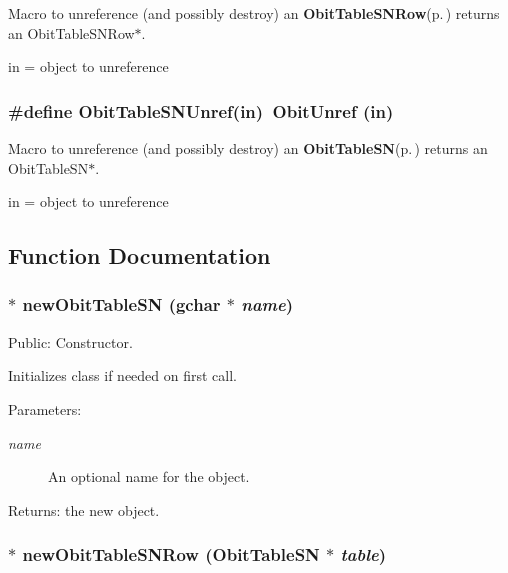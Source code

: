 Macro to unreference (and possibly destroy) an {\bf Obit\-Table\-SNRow}{\rm (p.\,\pageref{structObitTableSNRow})} returns an Obit\-Table\-SNRow$\ast$. 

in = object to unreference 
\subsubsection{\setlength{\rightskip}{0pt plus 5cm}\#define Obit\-Table\-SNUnref(in)\ Obit\-Unref (in)}\label{ObitTableSN_8h_a1}


Macro to unreference (and possibly destroy) an {\bf Obit\-Table\-SN}{\rm (p.\,\pageref{structObitTableSN})} returns an Obit\-Table\-SN$\ast$. 

in = object to unreference 

\subsection{Function Documentation}
\subsubsection{$\ast$ new\-Obit\-Table\-SN (gchar $\ast$ {\em name})}\label{ObitTableSN_8h_a11}


Public: Constructor. 

Initializes class if needed on first call. \begin{Desc}
\item[Parameters:]
\begin{description}
\item[{\em name}]An optional name for the object. \end{description}
\end{Desc}
\begin{Desc}
\item[Returns:]the new object. \end{Desc}
\subsubsection{$\ast$ new\-Obit\-Table\-SNRow ({\bf Obit\-Table\-SN} $\ast$ {\em table})}\label{ObitTableSN_8h_a8}



